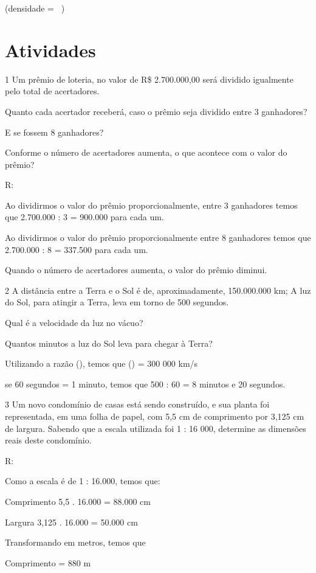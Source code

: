 {(densidade = \ )

\section{Atividades}

\num{1} Um prêmio de loteria, no valor de R\$ 2.700.000,00 será dividido
igualmente pelo total de acertadores.
\item Quanto cada acertador receberá, caso o prêmio seja dividido entre 3
ganhadores?
\item E se fossem 8 ganhadores?
\item Conforme o número de acertadores aumenta, o que acontece com o valor
do prêmio?

R:
\item Ao dividirmos o valor do prêmio proporcionalmente, entre 3 ganhadores
temos que 2.700.000 : 3 = 900.000 para cada um.
\item Ao dividirmos o valor do prêmio proporcionalmente entre 8 ganhadores
temos que 2.700.000 : 8 = 337.500 para cada um.
\item Quando o número de acertadores aumenta, o valor do prêmio diminui.

\num{2} A distância entre a Terra e o Sol é de, aproximadamente, 150.000.000
km; A luz do Sol, para atingir a Terra, leva em torno de 500 segundos.
\item Qual é a velocidade da luz no vácuo?
\item Quantos minutos a luz do Sol leva para chegar à Terra?
\item Utilizando a razão (), temos que
() = 300 000 km/s
\item se 60 segundos = 1 minuto, temos que 500 : 60 = 8 minutos e 20
segundos.

\num{3} Um novo condomínio de casas está sendo construído, e sua planta foi
representada, em uma folha de papel, com 5,5 cm de comprimento por 3,125
cm de largura. Sabendo que a escala utilizada foi 1 : 16 000, determine
as dimensões reais deste condomínio.

R:

Como a escala é de 1 : 16.000, temos que:

Comprimento 5,5 . 16.000 = 88.000 cm

Largura 3,125 . 16.000 = 50.000 cm

Transformando em metros, temos que

Comprimento = 880 m

}
